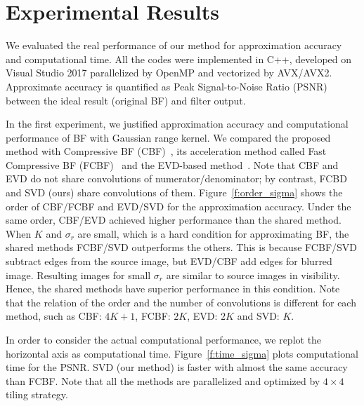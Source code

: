 \documentclass{article}
\begin{document}
\section{Experimental Results}

We evaluated the real performance of our method for approximation accuracy and computational time. 
All the codes were implemented in C++, developed on Visual Studio 2017 parallelized by OpenMP and vectorized by AVX/AVX2. 
Approximate accuracy is quantified as Peak Signal-to-Noise Ratio (PSNR) between the ideal result (original BF) and filter output.

In the first experiment, we justified approximation accuracy and computational performance of BF with Gaussian range kernel. We compared the proposed method with Compressive BF (CBF)~\cite{sugimoto2015compressive}, its acceleration method called Fast Compressive BF (FCBF)~\cite{deng2017fast} and the EVD-based method~\cite{sugimoto2016consant}. Note that CBF and EVD do not share convolutions of numerator/denominator; by contrast, FCBD and SVD (ours) share convolutions of them.
Figure~\ref{f:order_sigma} shows the order of CBF/FCBF and EVD/SVD for the approximation accuracy.
Under the same order, CBF/EVD achieved higher performance than the shared method. When $K$ and $\sigma_r$ are small, which is a hard condition for approximating BF, the shared methods FCBF/SVD outperforms the others.
This is because FCBF/SVD subtract edges from the source image, but EVD/CBF add edges for blurred image.
Resulting images for small $\sigma_r$ are similar to source images in visibility. Hence, the shared methods have superior performance in this condition.
Note that the relation of the order and the number of convolutions is different for each method, such as CBF: $4K+1$, FCBF: $2K$, EVD: $2K$ and SVD: $K$.

In order to consider the actual computational performance, we replot the horizontal axis as computational time.
Figure~\ref{f:time_sigma} plots computational time for the PSNR.
SVD (our method) is faster with almost the same accuracy than FCBF.
Note that all the methods are parallelized and optimized by $4 \times 4$ tiling strategy.
\end{document}
